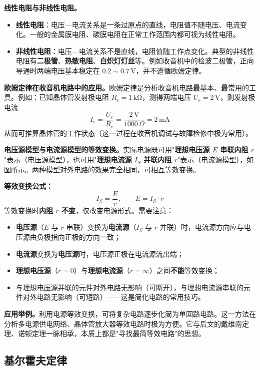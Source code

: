 \documentclass[12pt,UTF8]{ctexbook}
\begin{document}
\textbf{线性电阻与非线性电阻。}
\begin{itemize}
\item \textbf{线性电阻}：电压—电流关系是一条过原点的直线，电阻值不随电压、电流变化。一般的金属膜电阻、碳膜电阻在正常工作范围内都可视为线性电阻。
\item \textbf{非线性电阻}：电压—电流关系不是直线，电阻值随工作点变化。典型的非线性电阻有\textbf{二极管}、\textbf{热敏电阻}、\textbf{白炽灯灯丝}等。例如收音机中的检波二极管，正向导通时两端电压基本稳定在 $0.2\sim0.7\,\mathrm{V}$，并不遵循欧姆定律。
\end{itemize}

\textbf{欧姆定律在收音机电路中的应用。}欧姆定律是分析收音机电路最基本、最常用的工具。例如：已知晶体管发射极电阻 $R_e = 1\,\mathrm{k\Omega}$，测得两端电压 $U_e = 2\,\mathrm{V}$，则发射极电流
\[
I_e = \frac{U_e}{R_e} = \frac{2\,\mathrm{V}}{1000\,\Omega} = 2\,\mathrm{mA}
\]
从而可推算晶体管的工作状态（这一过程在收音机调试与故障检修中极为常用）。

\textbf{电压源模型与电流源模型的等效变换。}实际电源既可用"\textbf{理想电压源 $E$ 串联内阻 $r$}"表示（电压源模型），也可用"\textbf{理想电流源 $I_S$ 并联内阻 $r$}"表示（电流源模型），如图所示。两种模型对外电路的效果完全相同，可相互等效变换。


\textbf{等效变换公式：}
\[
I_S = \frac{E}{r}, \qquad E = I_S \cdot r
\]
等效变换时\textbf{内阻 $r$ 不变}，仅改变电源形式。需要注意：
\begin{itemize}
\item \textbf{电压源}（$E$ 与 $r$ 串联）变换为\textbf{电流源}（$I_S$ 与 $r$ 并联）时，电流源方向应与电压源由负极指向正极的方向一致；
\item \textbf{电流源}变换为\textbf{电压源}时，电压源正极在电流源流出端；
\item \textbf{理想电压源}（$r=0$）与\textbf{理想电流源}（$r=\infty$）之间\textbf{不能}等效变换；
\item 与理想电压源并联的元件对外电路无影响（可断开），与理想电流源串联的元件对外电路无影响（可短路）——这是简化电路的常用技巧。
\end{itemize}

\textbf{应用举例。}利用电源等效变换，可将复杂电路逐步化简为单回路电路。这一方法在分析多电源供电网络、晶体管放大器等效电路时极为方便。它与后文的戴维南定理、诺顿定理一脉相承，本质上都是"寻找最简等效电路"的思想。

\subsection{基尔霍夫定律}
\end{document}
